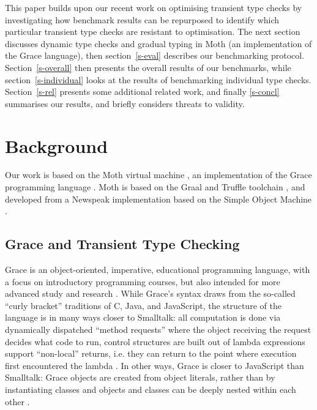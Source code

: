 \documentclass[sigplan,10pt,review,screen]{acmart}\settopmatter{printfolios=true}
\begin{document}
This paper builds upon our recent work on optimising transient
type checks \cite{Roberts2017,roberts-and-co-ecoop-2019} by
investigating how benchmark results can be repurposed to identify which
particular transient type checks are resistant to optimisation.
The next section discusses dynamic type checks and gradual typing in
Moth (an implementation of the Grace language), then section~\ref{s-eval} describes our benchmarking protocol. Section~\ref{s-overall} then presents the overall results of
our benchmarks, while section~\ref{s-individual}
looks at the results of benchmarking individual type checks.
Section~\ref{s-rel} presents some additional related work, and finally \ref{s-concl} summarises our results, and briefly considers threats to validity.

\section{Background}
\label{s-bg}

Our work is based on the Moth virtual machine 
\cite{Roberts2017,roberts-and-co-ecoop-2019},
an implementation
of the Grace programming language 
\citep{graceOnward12,graceSigcse13}.
Moth is based on the Graal and Truffle toolchain
\cite{Wurthinger:2017:PPE,Wurthinger2013},
and developed from a Newspeak implementation based on the  Simple
Object Machine \cite{Daloze2016,SOMns}.

\subsection{Grace and Transient Type Checking}

Grace is an object-oriented, imperative, educational programming
language, with a focus on introductory programming
courses, but also intended for more advanced study and research \citep{graceOnward12,graceSigcse13}.
%
While Grace's syntax draws
from the so-called ``curly bracket'' traditions of C, Java, and
JavaScript, the structure of the language
is in many ways closer to Smalltalk:
all computation is done via dynamically dispatched  ``method requests''
where the object receiving the request decides what code to run,
control structures are built out of lambda expressions support ``non-local'' returns, i.e. they can return to the point where execution first encountered the lambda \citep{bluebook}.  In
other ways, Grace is closer to JavaScript than Smalltalk: Grace
objects are created from object literals, rather than by
instantiating classes \citep{Black2007-emeraldHOPL,JonesECOOP2016} and
objects and classes can be deeply nested within each 
other \citep{betabook}.
\end{document}
